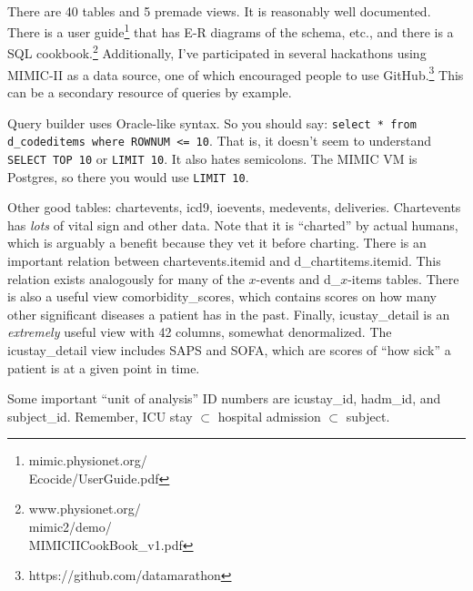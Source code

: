 \documentclass{tufte-handout}
\begin{document}
~\\

There are 40 tables and 5 premade views. It is reasonably well
documented. There is a user
guide\footnote{mimic.physionet.org/\\Ecocide/UserGuide.pdf} that has
E-R diagrams of the schema, etc., and there is a SQL
cookbook.\footnote{www.physionet.org/\\mimic2/demo/\\MIMICIICookBook\_v1.pdf}
Additionally, I've participated in several hackathons using MIMIC-II
as a data source, one of which encouraged people to use
GitHub.\footnote{https://github.com/datamarathon} This can be a
secondary resource of queries by example.

Query builder uses Oracle-like syntax. So you should say:
\texttt{select * from d\_codeditems where ROWNUM <= 10}. That is, it
doesn't seem to understand \texttt{SELECT TOP 10} or \texttt{LIMIT
  10}. It also hates semicolons. The MIMIC VM is Postgres, so there
you would use \texttt{LIMIT 10}. 

Other good tables: chartevents, icd9, ioevents, medevents, deliveries.
Chartevents has \emph{lots} of vital sign and other data. Note that it
is ``charted'' by actual humans, which is arguably a benefit because
they vet it before charting. There is an important relation between
chartevents.itemid and d\_chartitems.itemid. This relation exists
analogously for many of the $x$-events and d\_$x$-items tables. There
is also a useful view comorbidity\_scores, which contains scores on
how many other significant diseases a patient has in the past.
Finally, icustay\_detail is an \emph{extremely} useful view with 42
columns, somewhat denormalized. The icustay\_detail view includes SAPS
and SOFA, which are scores of ``how sick'' a patient is at a given
point in time.

Some important ``unit of analysis'' ID numbers are icustay\_id,
hadm\_id, and subject\_id. Remember, ICU stay $\subset$ hospital
admission $\subset$ subject. 
\end{document}
